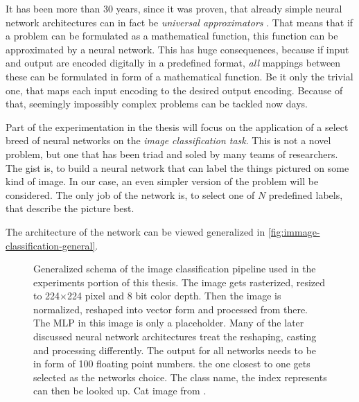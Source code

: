 It has been more than 30 years, since it was proven, that already simple neural network architectures can in fact be \emph{universal approximators} \cite*{ffnUnversalApproximator}. 
That means that if a problem can be formulated as a mathematical function, this function can be approximated by a neural network.
This has huge consequences, because if input and output are encoded digitally in a predefined format, \emph{all} mappings between these can be formulated in form of a mathematical function. 
Be it only the trivial one, that maps each input encoding to the desired output encoding.
Because of that, seemingly impossibly complex problems can be tackled now days. 

Part of the experimentation in the thesis will focus on the application of a select breed of neural networks on the \emph{image classification task}.
This is not a novel problem, but one that has been triad and soled by many teams of researchers. 
The gist is, to build a neural network that can label the things pictured on some kind of image.
In our case, an even simpler version of the problem will be considered. 
The only job of the network is, to select one of $N$ predefined labels, that describe the picture best.

The architecture of the network can be viewed generalized in \autoref{fig:immage-classification-general}.

\begin{figure}[htbp]
    \centering
    \caption{Generalized schema of the image classification pipeline used in the experiments portion of this thesis.
        The image gets rasterized, resized to 224$\times$224 pixel and 8 bit color depth. Then the image is normalized, reshaped into vector form and processed from there. The MLP in this image is only a placeholder. Many of the later discussed neural network architectures treat the reshaping, casting and processing differently. The output for all networks needs to be in form of 100 floating point numbers. the one closest to one gets selected as the networks choice. The class name, the index represents can then be looked up.
        Cat image from \cite{catPhoto}.
    }
    \label{fig:immage-classification-general}
\end{figure}
